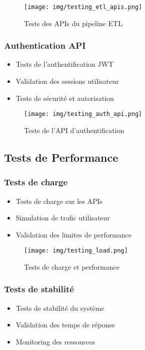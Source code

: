 \begin{figure}[H]
    \centering
    \texttt{[image: img/testing\_etl\_apis.png]}
    \caption{Tests des APIs du pipeline ETL}
    \label{fig:testing_etl_apis}
\end{figure}

\subsubsection{Authentication API}
\begin{itemize}
    \item Tests de l'authentification JWT
    \item Validation des sessions utilisateur
    \item Tests de sécurité et autorisation
\end{itemize}

\begin{figure}[H]
    \centering
    \texttt{[image: img/testing\_auth\_api.png]}
    \caption{Tests de l'API d'authentification}
    \label{fig:testing_auth_api}
\end{figure}

\subsection{Tests de Performance}
\subsubsection{Tests de charge}
\begin{itemize}
    \item Tests de charge sur les APIs
    \item Simulation de trafic utilisateur
    \item Validation des limites de performance
\end{itemize}

\begin{figure}[H]
    \centering
    \texttt{[image: img/testing\_load.png]}
    \caption{Tests de charge et performance}
    \label{fig:testing_load}
\end{figure}

\subsubsection{Tests de stabilité}
\begin{itemize}
    \item Tests de stabilité du système
    \item Validation des temps de réponse
    \item Monitoring des ressources
\end{itemize}

